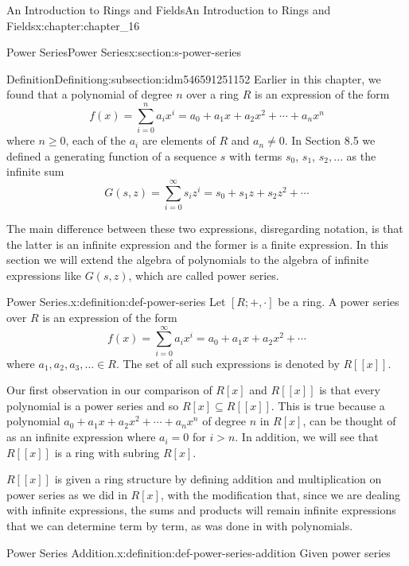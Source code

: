 \documentclass[oneside,10pt,]{book}
\numberwithin{equation}{section}
\begin{document}
\begin{chapterptx}{An Introduction to Rings and Fields}{}{An Introduction to Rings and Fields}{}{}{x:chapter:chapter_16}
\begin{sectionptx}{Power Series}{}{Power Series}{}{}{x:section:s-power-series}
\begin{subsectionptx}{Definition}{}{Definition}{}{}{g:subsection:idm546591251152}
Earlier in this chapter, we found that a polynomial of degree \(n\) over a ring \(R\)  is an expression of the form%
\begin{equation*}
f(x)=\sum_{i=0}^n a_i x^i=a_0 + a_1 x+a_2 x^2+ \cdots +a_n x^n
\end{equation*}
where  \(n\geq 0\), each of the \(a_i\) are elements of \(R\) and \(a_n\neq 0\). In Section 8.5 we defined a generating function of a sequence \(s\) with terms \(s_0\), \(s_1\), \(s_2, \ldots\)  as the infinite sum%
\begin{equation*}
G(s,z)= \sum_{i=0}^{\infty } s_i z^i=s_0 + s_1 z+s_2 z^2+ \cdots
\end{equation*}
%
\par
The main difference between these two expressions, disregarding notation, is that the latter is an infinite expression and the former is a finite expression. In this section we will extend the algebra of polynomials to the algebra of infinite expressions like \(G(s, z)\),  which are called power series.%
\begin{definition}{Power Series.}{x:definition:def-power-series}%
%
\label{g:notation:idm546591243456}%
Let \([R; +,\cdot ]\) be a ring. A power series over \(R\) is an expression of the form%
\begin{equation*}
f(x)=\sum_{i=0}^{\infty } a_i x^i=a_0 + a_1 x+a_2 x^2+ \cdots
\end{equation*}
where \(a_1, a_2, a_3,\ldots \in  R\).  The set of all such expressions is denoted by \(R[[x]]\).%
\end{definition}
Our first observation in our comparison of \(R[x]\) and \(R[[x]]\) is that every polynomial is a power series and so \(R[x]\subseteq R[[x]]\). This is true because a polynomial \(a_0 + a_1 x+a_2 x^2+ \cdots +a_n x^n\) of degree \(n\) in \(R[x]\), can be thought of as an infinite expression where \(a_i=0\) for \(i > n\).  In addition, we will see that \(R[[x]]\) is a ring with subring \(R[x]\).%
\par
\(R[[x]]\) is given a ring structure by defining addition and multiplication on power series as we did in \(R[x]\), with the modification that, since we are dealing with infinite expressions, the sums and products will remain infinite expressions that we can determine term by term, as was done in with polynomials.%
\begin{definition}{Power Series Addition.}{x:definition:def-power-series-addition}%
Given power series%
\begin{equation*}
\begin{array}{c}

\end{array}
\end{equation*}
\end{definition}
\end{subsectionptx}
\end{sectionptx}
\end{chapterptx}
\end{document}
